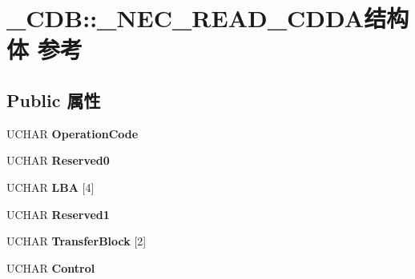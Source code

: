 \hypertarget{struct___c_d_b_1_1___n_e_c___r_e_a_d___c_d_d_a}{}\section{\+\_\+\+C\+DB\+:\+:\+\_\+\+N\+E\+C\+\_\+\+R\+E\+A\+D\+\_\+\+C\+D\+D\+A结构体 参考}
\label{struct___c_d_b_1_1___n_e_c___r_e_a_d___c_d_d_a}
\subsection*{Public 属性}
\begin{DoxyCompactItemize}
\item 
\mbox{\label{struct___c_d_b_1_1___n_e_c___r_e_a_d___c_d_d_a_ad5bf571e4946e5ae66d3d03d3ac9e704}} 
U\+C\+H\+AR {\bfseries Operation\+Code}
\item 
\mbox{\label{struct___c_d_b_1_1___n_e_c___r_e_a_d___c_d_d_a_a5bb26a3e5dd4869f7f4128d397533625}} 
U\+C\+H\+AR {\bfseries Reserved0}
\item 
\mbox{\label{struct___c_d_b_1_1___n_e_c___r_e_a_d___c_d_d_a_a9eb221c740818de128e64d4f011f5fe3}} 
U\+C\+H\+AR {\bfseries L\+BA} \mbox{[}4\mbox{]}
\item 
\mbox{\label{struct___c_d_b_1_1___n_e_c___r_e_a_d___c_d_d_a_a67e2b0184ecc759334eb7127b03b48a1}} 
U\+C\+H\+AR {\bfseries Reserved1}
\item 
\mbox{\label{struct___c_d_b_1_1___n_e_c___r_e_a_d___c_d_d_a_a822eb6c512be24f664abed7ca7425ec7}} 
U\+C\+H\+AR {\bfseries Transfer\+Block} \mbox{[}2\mbox{]}
\item 
\mbox{\label{struct___c_d_b_1_1___n_e_c___r_e_a_d___c_d_d_a_a1d40834e38d40bb39cef0596e694aa79}} 
U\+C\+H\+AR {\bfseries Control}
\item 
\mbox{\label{struct___c_d_b_1_1___n_e_c___r_e_a_d___c_d_d_a_a258491f8d3b8e67bb03457b2c9169189}} 

\end{DoxyCompactItemize}

